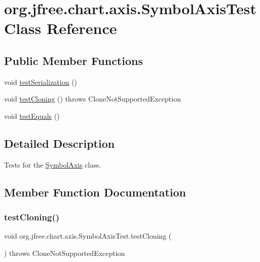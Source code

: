 \hypertarget{classorg_1_1jfree_1_1chart_1_1axis_1_1_symbol_axis_test}{}\section{org.\+jfree.\+chart.\+axis.\+Symbol\+Axis\+Test Class Reference}
\label{classorg_1_1jfree_1_1chart_1_1axis_1_1_symbol_axis_test}
\subsection*{Public Member Functions}
\begin{DoxyCompactItemize}
\item 
void \mbox{\hyperlink{classorg_1_1jfree_1_1chart_1_1axis_1_1_symbol_axis_test_a9d0e27de08dd5ed6d9f855e53605346f}{test\+Serialization}} ()
\item 
void \mbox{\hyperlink{classorg_1_1jfree_1_1chart_1_1axis_1_1_symbol_axis_test_a640001eb9a5d8a9c8557074eef3dac9e}{test\+Cloning}} ()  throws Clone\+Not\+Supported\+Exception 
\item 
void \mbox{\hyperlink{classorg_1_1jfree_1_1chart_1_1axis_1_1_symbol_axis_test_a0ed4743eac47257030a9a236d1a8d1f5}{test\+Equals}} ()
\end{DoxyCompactItemize}


\subsection{Detailed Description}
Tests for the \mbox{\hyperlink{classorg_1_1jfree_1_1chart_1_1axis_1_1_symbol_axis}{Symbol\+Axis}} class. 

\subsection{Member Function Documentation}
\mbox{\label{classorg_1_1jfree_1_1chart_1_1axis_1_1_symbol_axis_test_a640001eb9a5d8a9c8557074eef3dac9e}} 
\subsubsection{\texorpdfstring{test\+Cloning()}{testCloning()}}
{\footnotesize\ttfamily void org.\+jfree.\+chart.\+axis.\+Symbol\+Axis\+Test.\+test\+Cloning (\begin{DoxyParamCaption}{ }\end{DoxyParamCaption}) throws Clone\+Not\+Supported\+Exception}

